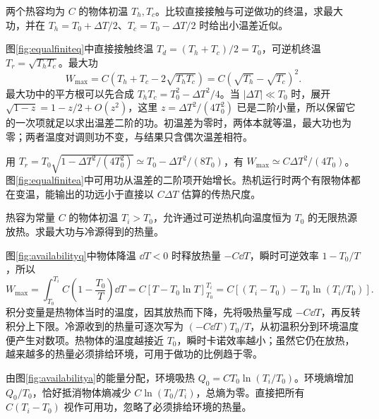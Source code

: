 \begin{exercise}[等热容有限热源与直接传热的损失]
两个热容均为 $C$ 的物体初温 $T_h,T_c$。比较直接接触与可逆做功的终温，求最大功，并在 $T_h=T_0+\Delta T/2$、$T_c=T_0-\Delta T/2$ 时给出小温差近似。
\end{exercise}
\begin{solution}
图\ref{fig:equalfiniteq}中直接接触终温 $T_d=(T_h+T_c)/2=T_0$，可逆机终温 $T_r=\sqrt{T_hT_c}$。最大功
\[
 W_{\max}=C(T_h+T_c-2\sqrt{T_hT_c})
 =C(\sqrt{T_h}-\sqrt{T_c})^2.
\]
最大功中的平方根可以先合成 $T_hT_c=T_0^2-\Delta T^2/4$。当 $|\Delta T|\ll T_0$ 时，展开 $\sqrt{1-z}=1-z/2+O(z^2)$，这里 $z=\Delta T^2/(4T_0^2)$ 已是二阶小量，所以保留它的一次项就足以求出温差二阶的功。初温差为零时，两体本就等温，最大功也为零；两者温度对调则功不变，与结果只含偶次温差相符。

用 $T_r=T_0\sqrt{1-\Delta T^2/(4T_0^2)}\simeq T_0-\Delta T^2/(8T_0)$，有 $W_{\max}\simeq C\Delta T^2/(4T_0)$。图\ref{fig:equalfinitea}中可用功从温差的二阶项开始增长。热机运行时两个有限物体都在变温，能输出的功远小于直接以 $C\Delta T$ 估算的传热尺度。
\end{solution}

\begin{exercise}[有限热物体对无限冷源的最大功]
热容为常量 $C$ 的物体初温 $T_i>T_0$，允许通过可逆热机向温度恒为 $T_0$ 的无限热源放热。求最大功与冷源得到的热量。
\end{exercise}
\begin{solution}
图\ref{fig:availabilityq}中物体降温 $\dd T<0$ 时释放热量 $-C\dd T$，瞬时可逆效率 $1-T_0/T$，所以
\[
 W_{\max}=\int_{T_0}^{T_i}C\left(1-\frac{T_0}T\right)\dd T
 =C[T-T_0\ln T]_{T_0}^{T_i}
 =C[(T_i-T_0)-T_0\ln(T_i/T_0)].
\]
积分变量是热物体当时的温度，因其放热而下降，先将吸热量写成 $-C\dd T$，再反转积分上下限。冷源收到的热量可逐次写为 $(-C\dd T)T_0/T$，从初温积分到环境温度便产生对数项。热物体的温度越接近 $T_0$，瞬时卡诺效率越小；虽然它仍在放热，越来越多的热量必须排给环境，可用于做功的比例趋于零。

由图\ref{fig:availabilitya}的能量分配，环境吸热 $Q_0=CT_0\ln(T_i/T_0)$。环境熵增加 $Q_0/T_0$，恰好抵消物体熵减少 $C\ln(T_0/T_i)$，总熵为零。直接把所有 $C(T_i-T_0)$ 视作可用功，忽略了必须排给环境的热量。
\end{solution}

